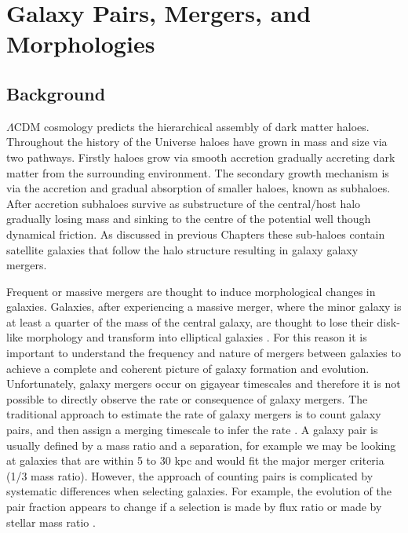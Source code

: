 
\chapter{Galaxy Pairs, Mergers, and Morphologies} 
\label{Chapter:GalPairs}

\section{Background}

$\Lambda$CDM cosmology predicts the hierarchical assembly of dark matter haloes.
Throughout the history of the Universe haloes have grown in mass and size via two pathways. 
Firstly haloes grow via smooth accretion gradually accreting dark matter from the surrounding environment. 
The secondary growth mechanism is via the accretion and gradual absorption of smaller haloes, known as subhaloes. 
After accretion subhaloes survive as substructure of the central/host halo gradually losing mass and sinking to the centre of the potential well though dynamical friction. As discussed in previous Chapters these sub-haloes contain satellite galaxies that follow the halo structure resulting in galaxy galaxy mergers.

Frequent or massive mergers are thought to induce morphological changes in galaxies. 
Galaxies, after experiencing a massive merger, where the minor galaxy is at least a quarter of the mass of the central galaxy, are thought to lose their disk-like morphology and transform into elliptical galaxies \citep{Negroponte1983SimulationsGalaxies, DeLucia2006TheGalaxies}. 
For this reason it is important to understand the frequency and nature of mergers between galaxies to achieve a complete and coherent picture of galaxy formation and evolution. 
Unfortunately, galaxy mergers occur on gigayear timescales and therefore it is not possible to directly observe the rate or consequence of galaxy mergers. 
The traditional approach to estimate the rate of galaxy mergers is to count galaxy pairs, and then assign a merging timescale to infer the rate \citep{Conselice2003A3,Conselice2008TheField,Mundy2017A3.5,Duncan2019ObservationalFields}.
A galaxy pair is usually defined by a mass ratio and a separation, for example we may be looking at galaxies that are within 5 to 30 kpc and would fit the major merger criteria (1/3 mass ratio).
However, the approach of counting pairs is complicated by systematic differences when selecting galaxies. For example, the evolution of the pair fraction appears to change if a selection is made by flux ratio or made by stellar mass ratio \citep{Man2016RESOLVING03}.

